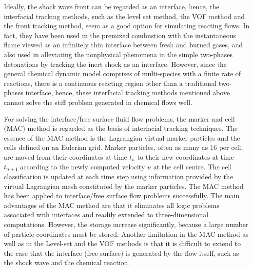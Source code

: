 \documentclass[review]{elsarticle}
\theoremstyle{plain}\newtheorem{definition}{\sc{Definition}}
\theoremstyle{defination}\newtheorem{example}{Example}[section]
\numberwithin{equation}{section}
\numberwithin{table}{section}
\begin{document}
{Ideally, the shock wave front can be regarded as an interface, hence, the interfacial tracking methods, such as the level set method, the  VOF method and the front tracking method, seem as a good option for simulating reacting flows. In fact,  
they have been used in the premixed combustion with the instantaneous flame viewed as an infinitely thin interface between fresh and burned gases\cite{poinsot1992study, moureau2009level}, and also used in alleviating the nonphysical phenomena\cite{nguyen2002fully} in the simple two-phases detonations by tracking the inert shock as an interface.
However, since the
general chemical dynamic model comprises of multi-species with a finite rate of
reactions, there is a continuous reacting region other than a traditional two-phases interface, hence, these interfacial tracking methods mentioned above
 cannot solve the stiff problem generated in chemical flows well.


For solving the interface/free surface fluid flow problems, the marker and cell (MAC) method is regarded as the basis of interfacial tracking techniques\cite{mckee2008mac}. 
The essence of the MAC method is the Lagrangian virtual marker particles and the cells defined on an Eulerian grid. Marker particles, often as many as 16 per cell, are moved from their coordinates at time $t_n$ to their new coordinates at time $t_{n+1}$ according to the newly computed velocity $u$ at the cell centre. The cell classification is updated at each time step using information provided by the virtual Lagrangian mesh constituted by the marker particles. The MAC method has been applied to interface/free surface flow problems successfully\cite{de2004front,tome2001gensmac3d,yoon2009unstructured}.
The main advantages of the MAC method are that it eliminates all logic problems associated with interfaces and readily extended to three-dimensional computations.
However, the storage increase significantly, because a large number of particle coordinates must be stored. Another limitation in the MAC method as well as in the Level-set and the VOF methods is that it is difficult to extend to the case that the interface (free surface) is generated by the flow itself, such as the shock wave and the chemical reaction.

}
\end{document}

